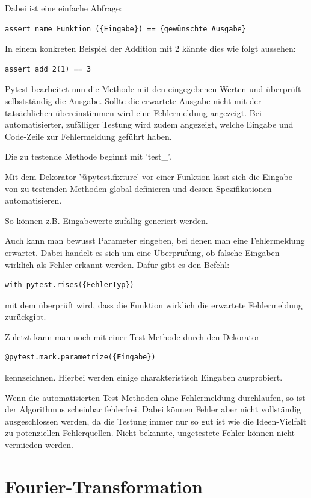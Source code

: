\documentclass[]{dsadokumentation}
\begin{document}
Dabei ist eine einfache Abfrage:

\begin{verbatim}
assert name_Funktion ({Eingabe}) == {gewünschte Ausgabe}
\end{verbatim}
In einem konkreten Beispiel der Addition mit 2 kännte dies wie folgt aussehen:
\begin{verbatim}
assert add_2(1) == 3
\end{verbatim}
Pytest bearbeitet nun die Methode mit den eingegebenen Werten und überprüft selbstständig die Ausgabe. Sollte die erwartete Ausgabe nicht mit der tatsächlichen übereinstimmen wird eine Fehlermeldung angezeigt. Bei automatisierter, zufälliger Testung wird zudem angezeigt, welche Eingabe und Code-Zeile zur Fehlermeldung geführt haben.

Die zu testende Methode beginnt mit 'test\_'.

Mit dem Dekorator '@pytest.fixture' vor einer Funktion lässt sich die Eingabe von zu testenden Methoden global definieren und dessen Spezifikationen automatisieren.

So können z.B. Eingabewerte zufällig generiert werden.

Auch kann man bewusst Parameter eingeben, bei denen man eine Fehlermeldung erwartet. Dabei handelt es sich um eine Überprüfung, ob falsche Eingaben wirklich als Fehler erkannt werden. Dafür gibt es den Befehl:
\begin{verbatim}
with pytest.rises({FehlerTyp})
\end{verbatim}
mit dem überprüft wird, dass die Funktion wirklich die erwartete Fehlermeldung zurückgibt.

Zuletzt kann man noch mit einer Test-Methode durch den Dekorator
\begin{verbatim}
@pytest.mark.parametrize({Eingabe})
\end{verbatim}
kennzeichnen. Hierbei werden einige charakteristisch Eingaben ausprobiert.

Wenn die automatisierten Test-Methoden ohne Fehlermeldung durchlaufen, so ist der Algorithmus scheinbar fehlerfrei. Dabei können Fehler aber nicht vollständig ausgeschlossen werden, da die Testung immer nur so gut ist wie die Ideen-Vielfalt zu potenziellen Fehlerquellen. Nicht bekannte, ungetestete Fehler können nicht vermieden werden.

\section{Fourier-Transformation}
\end{document}
